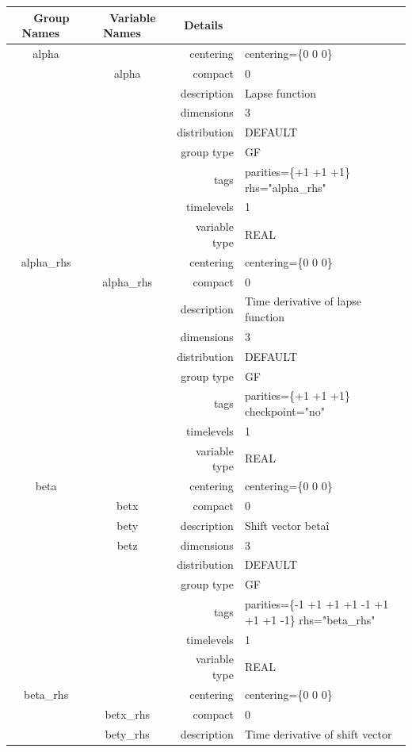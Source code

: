 \vspace{5mm}

\begin{tabular*}{150mm}{|c|c@{\extracolsep{\fill}}|rl|} \hline 
~ {\bf Group Names} ~ & ~ {\bf Variable Names} ~  &{\bf Details} ~ & ~\\ 
\hline 
alpha &  & centering & centering=\{0 0 0\} \\ 
 & alpha & compact & 0 \\ 
 &  & description & Lapse function \\ 
 &  & dimensions & 3 \\ 
 &  & distribution & DEFAULT \\ 
 &  & group type & GF \\ 
 &  & tags & parities=\{+1 +1 +1\} rhs="alpha\_rhs" \\ 
 &  & timelevels & 1 \\ 
 &  & variable type & REAL \\ 
\hline 
alpha\_rhs &  & centering & centering=\{0 0 0\} \\ 
 & alpha\_rhs & compact & 0 \\ 
 &  & description & Time derivative of lapse function \\ 
 &  & dimensions & 3 \\ 
 &  & distribution & DEFAULT \\ 
 &  & group type & GF \\ 
 &  & tags & parities=\{+1 +1 +1\} checkpoint="no" \\ 
 &  & timelevels & 1 \\ 
 &  & variable type & REAL \\ 
\hline 
beta &  & centering & centering=\{0 0 0\} \\ 
 & betx & compact & 0 \\ 
 & bety & description & Shift vector beta\^i \\ 
 & betz & dimensions & 3 \\ 
 &  & distribution & DEFAULT \\ 
 &  & group type & GF \\ 
 &  & tags & parities=\{-1 +1 +1  +1 -1 +1  +1 +1 -1\}  rhs="beta\_rhs" \\ 
 &  & timelevels & 1 \\ 
 &  & variable type & REAL \\ 
\hline 
beta\_rhs &  & centering & centering=\{0 0 0\} \\ 
 & betx\_rhs & compact & 0 \\ 
 & bety\_rhs & description & Time derivative of shift vector \\ 

\end{tabular*}
